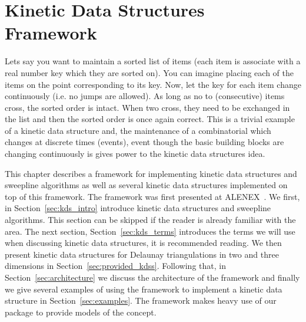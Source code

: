
\chapter{Kinetic Data Structures Framework}
\label{chapter-kds}
\minitoc




\def\note#1{$\langle\langle${\bf #1}$\rangle\rangle$}




Lets say you want to maintain a sorted list of items (each item is
associate with a real number key which they are sorted on). You can
imagine placing each of the items on the point corresponding to its
key. Now, let the key for each item change continuously (i.e. no jumps
are allowed). As long as no to (consecutive) items cross, the sorted
order is intact. When two cross, they need to be exchanged in the list
and then the sorted order is once again correct. This is a trivial
example of a kinetic data structure and, the maintenance of a
combinatorial which changes at discrete times (events), event though
the basic building blocks are changing continuously is gives power to
the kinetic data structures idea.

This chapter describes a framework for implementing kinetic data
structures and sweepline algorithms as well as several kinetic data
structures implemented on top of this framework. The framework was
first presented at ALENEX~\cite{cgal:gkr-cfhm-04}. We first, in
Section~\ref{sec:kds_intro} introduce kinetic data structures and
sweepline algorithms. This section can be skipped if the reader is
already familiar with the area. The next section,
Section~\ref{sec:kds_terms} introduces the terms we will use when
discussing kinetic data structures, it is recommended reading. We then
present kinetic data structures for Delaunay triangulations in two and
three dimensions in Section~\ref{sec:provided_kdss}. Following that,
in Section~\ref{sec:architecture} we discuss the architecture of the
framework and finally we give several examples of using the framework
to implement a kinetic data structure in
Section~\ref{sec:examples}. The framework makes heavy use of our
 package to provide models of the 
concept.

